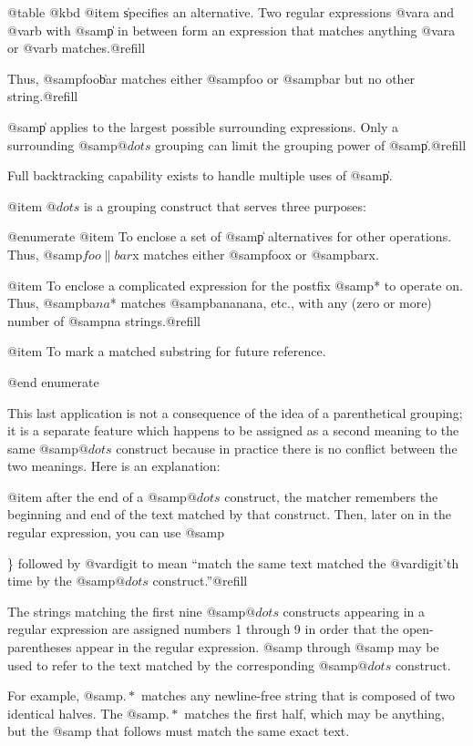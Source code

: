 {{{{{{{{{{{{{@table @kbd
@item \|
specifies an alternative.
Two regular expressions @var{a} and @var{b} with @samp{\|} in
between form an expression that matches anything @var{a} or
@var{b} matches.@refill

Thus, @samp{foo\|bar} matches either @samp{foo} or @samp{bar}
but no other string.@refill

@samp{\|} applies to the largest possible surrounding expressions.  Only a
surrounding @samp{\( @dots{} \)} grouping can limit the grouping power of
@samp{\|}.@refill

Full backtracking capability exists to handle multiple uses of @samp{\|}.

@item \( @dots{} \)
is a grouping construct that serves three purposes:

@enumerate
@item
To enclose a set of @samp{\|} alternatives for other operations.
Thus, @samp{\(foo\|bar\)x} matches either @samp{foox} or @samp{barx}.

@item
To enclose a complicated expression for the postfix @samp{*} to operate on.
Thus, @samp{ba\(na\)*} matches @samp{bananana}, etc., with any (zero or
more) number of @samp{na} strings.@refill

@item
To mark a matched substring for future reference.

@end enumerate

This last application is not a consequence of the idea of a
parenthetical grouping; it is a separate feature which happens to be
assigned as a second meaning to the same @samp{\( @dots{} \)} construct
because in practice there is no conflict between the two meanings.
Here is an explanation:

@item 
after the end of a @samp{\( @dots{} \)} construct, the matcher remembers the
beginning and end of the text matched by that construct.  Then, later on
in the regular expression, you can use @samp{\} followed by @var{digit}
to mean ``match the same text matched the @var{digit}'th time by the
@samp{\( @dots{} \)} construct.''@refill

The strings matching the first nine @samp{\( @dots{} \)} constructs appearing
in a regular expression are assigned numbers 1 through 9 in order that the
open-parentheses appear in the regular expression.  @samp{\1} through
@samp{\9} may be used to refer to the text matched by the corresponding
@samp{\( @dots{} \)} construct.

For example, @samp{\(.*\)\1} matches any newline-free string that is
composed of two identical halves.  The @samp{\(.*\)} matches the first
half, which may be anything, but the @samp{\1} that follows must match
the same exact text.

}}}}}}}}}}}}}}
